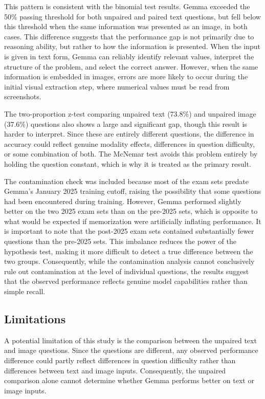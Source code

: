 \documentclass{article}
\begin{document}
This pattern is consistent with the binomial test results. Gemma exceeded the 50\% passing threshold for both unpaired and paired text questions, but fell below this threshold when the same information was presented as an image, in both cases. This difference suggests that the performance gap is not primarily due to reasoning ability, but rather to how the information is presented. When the input is given in text form, Gemma can reliably identify relevant values, interpret the structure of the problem, and select the correct answer. However, when the same information is embedded in images, errors are more likely to occur during the initial visual extraction step, where numerical values must be read from screenshots.

The two-proportion z-test comparing unpaired text (73.8\%) and unpaired image 
(37.6\%) questions also shows a large and significant gap, though this result is 
harder to interpret. Since these are entirely different questions, the difference 
in accuracy could reflect genuine modality effects, differences in question 
difficulty, or some combination of both. The McNemar test avoids this problem 
entirely by holding the question constant, which is why it is treated as the 
primary result.

The contamination check was included because most of the exam sets predate Gemma's January 2025 training cutoff, raising the possibility that some questions had been encountered during training. However, Gemma performed slightly better on the two 2025 exam sets than on the pre-2025 sets, which is opposite to what would be expected if memorization were artificially inflating performance. It is important to note that the post-2025 exam sets contained substantially fewer questions than the pre-2025 sets. This imbalance reduces the power of the hypothesis test, making it more difficult to detect a true difference between the two groups. Consequently, while the contamination analysis cannot conclusively rule out contamination at the level of individual questions, the results suggest that the observed performance reflects genuine model capabilities rather than simple recall.



\subsection{Limitations}
A potential limitation of this study is the comparison between the unpaired text and image questions. Since the questions are different, any observed performance difference could partly reflect differences in question difficulty rather than differences between text and image inputs. Consequently, the unpaired comparison alone cannot determine whether Gemma performs better on text or image inputs.
\end{document}
